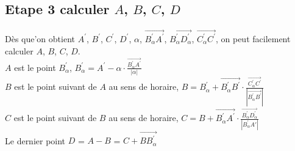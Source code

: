 \documentclass[14px]{article}
\begin{document}
\subsection{Etape 3 calculer $A$, $B$, $C$, $D$}
Dès que'on obtient $A^{\prime}$,  $B^{\prime}$, $C^{\prime}$, $D^{\prime}$, $\alpha$, $\overrightarrow{B^{\prime}_{\alpha}A^{\prime}}$, $\overrightarrow{B^{\prime}_{\alpha}D^{\prime}_{\alpha}}$,
$\overrightarrow{C^{\prime}_{\alpha}C^{\prime}}$, on peut facilement calculer $A$, $B$, $C$, $D$.\\
$A$ est le point $B^{\prime}_{\alpha}$, $B^{\prime}_{\alpha} = A^{\prime} - \alpha\cdot\frac{\overrightarrow{B^{\prime}_{\alpha}A^{\prime}}}{|\alpha|}$\\
$B$ est le point suivant de $A$ au sens de horaire, $B =  B^{\prime}_{\alpha} +  \overrightarrow{B^{\prime}_{\alpha}B^{\prime}}\cdot\frac {\overrightarrow{C^{\prime}_{\alpha}C^{\prime}}}{|\overrightarrow{B^{\prime}_{\alpha}B^{\prime}}|}$\\
$C$ est le point suivant de $B$ au sens de horaire, $C = B + \overrightarrow{B^{\prime}_{\alpha}A^{\prime}}\cdot\frac{\overrightarrow{B^{\prime}_{\alpha}D^{\prime}_{\alpha}}}{|B^{\prime}_{\alpha}A{\prime}|}$\\
Le dernier point $D$ = $A - B$ = $C + \overrightarrow{BB^{\prime}_{\alpha}}$
\end{document}
